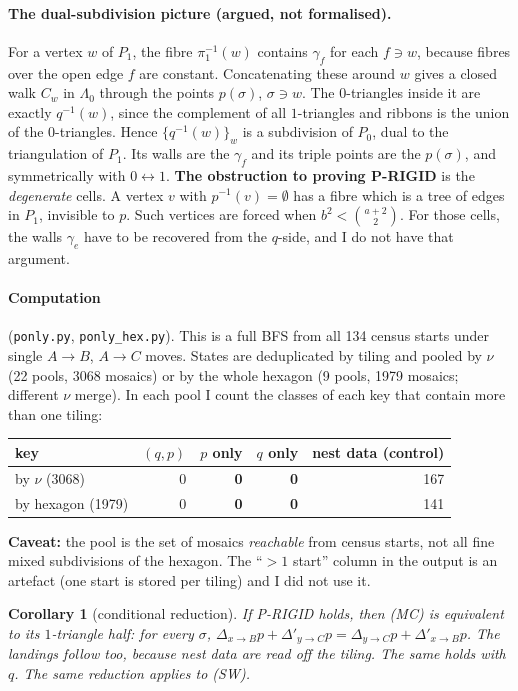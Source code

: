 \documentclass[11pt]{article}
\newtheorem{corollary}[theorem]{Corollary}
\theoremstyle{definition}
\begin{document}
\paragraph{The dual-subdivision picture (argued, not formalised).} For a vertex $w$ of $P_1$, the fibre $\pi_1^{-1}(w)$ contains $\gamma_f$ for each
$f\ni w$, because fibres over the open edge $f$ are constant. Concatenating these around $w$ gives a closed walk $C_w$ in $\Lambda_0$ through the
points $p(\sigma)$, $\sigma\ni w$. The $0$-triangles inside it are exactly $q^{-1}(w)$, since the complement of all $1$-triangles and ribbons is
the union of the $0$-triangles. Hence $\{q^{-1}(w)\}_w$ is a subdivision of $P_0$, dual to the triangulation of $P_1$. Its walls are the $\gamma_f$
and its triple points are the $p(\sigma)$, and symmetrically with $0\leftrightarrow1$. \textbf{The obstruction to proving P-RIGID} is the
\emph{degenerate} cells. A vertex $v$ with $p^{-1}(v)=\emptyset$ has a fibre which is a tree of edges in $P_1$, invisible to $p$. Such vertices are
forced when $b^2<\binom{a+2}2$. For those cells, the walls $\gamma_e$ have to be recovered from the $q$-side, and I do not have that argument.

\paragraph{Computation} (\texttt{ponly.py}, \texttt{ponly\_hex.py}). This is a full BFS from all 134 census starts under single $A\to B$, $A\to C$ moves.
States are deduplicated by tiling and pooled by $\nu$ (22 pools, 3068 mosaics) or by the whole hexagon (9 pools, 1979 mosaics; different $\nu$
merge). In each pool I count the classes of each key that contain more than one tiling:
\begin{center}\begin{tabular}{lrrrr}\toprule
key & $(q,p)$ & $p$ only & $q$ only & nest data (control)\\\midrule
by $\nu$ (3068) & 0 & \textbf{0} & \textbf{0} & 167\\
by hexagon (1979) & 0 & \textbf{0} & \textbf{0} & 141\\\bottomrule
\end{tabular}\end{center}
\textbf{Caveat:} the pool is the set of mosaics \emph{reachable} from census starts, not all fine mixed subdivisions of the hexagon. The
``$>1$ start'' column in the output is an artefact (one start is stored per tiling) and I did not use it.

\begin{corollary}[conditional reduction]
If P-RIGID holds, then (MC) is equivalent to its $1$-triangle half: for every $\sigma$,
$\Delta_{x\to B}p+\Delta'_{y\to C}p=\Delta_{y\to C}p+\Delta'_{x\to B}p$. The landings follow too, because nest data are read off the tiling.
The same holds with $q$. The same reduction applies to (SW).
\end{corollary}
\end{document}
